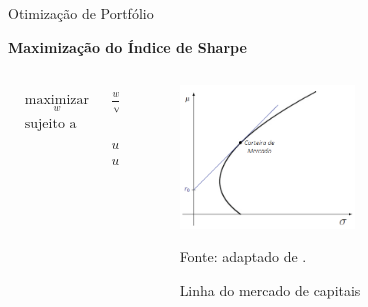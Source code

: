     \begin{frame}{Otimização de Portfólio}

        \LARGE \textbf{Maximização do Índice de Sharpe}

        \begin{columns}
            \begin{column}{0.5\textwidth}

                \begin{equation}
                    \label{eq:sharpe}
                    \begin{aligned}
                        & \underset{w}{\text{maximizar}}
                        & & \frac{w^T \mu - r_f}{\sqrt{w^T \Sigma w}} \\
                        & \text{sujeito a} \\
                        & & & w^T \mathbf{1} = 1 \\
                        & & & w \geq 0
                    \end{aligned}
                \end{equation}

            \end{column}

            \begin{column}{0.5\textwidth}

                    \begin{figure}[htbp]
                        \centering
                        \caption{Linha do mercado de capitais}
                        \label{fig:carteira_de_mercado}
                        \includegraphics[width=0.6\textwidth]{images/carteira_de_mercado.png}
                        \par \footnotesize Fonte: adaptado de \citeauthor{mansini2015linear}.
                    \end{figure}
        
            \end{column}
        \end{columns}

    \end{frame}






